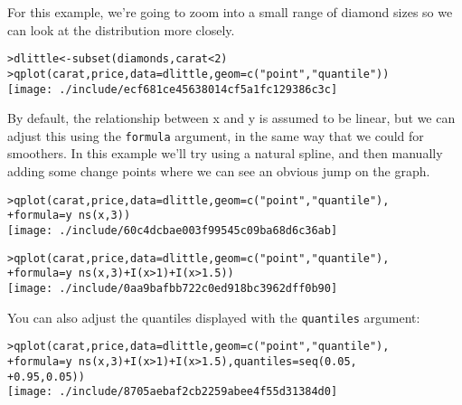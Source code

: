 For this example, we're going to zoom into a small range of diamond sizes so we can look at the distribution more closely.

\begin{alltt}
> dlittle <- subset(diamonds, carat < 2)
> qplot(carat, price, data = dlittle, geom = c("point", "quantile"))
\texttt{[image: ./include/ecf681ce45638014cf5a1fc129386c3c]}

\end{alltt}

By default, the relationship between x and y is assumed to be linear, but we can adjust this using the {\tt formula} argument, in the same way that we could for smoothers.  In this example we'll try using a natural spline, and then manually adding some change points where we can see an obvious jump on the graph.

\begin{alltt}
> qplot(carat, price, data = dlittle, geom = c("point", "quantile"), 
+     formula = y ~ ns(x, 3))
\texttt{[image: ./include/60c4dcbae003f99545c09ba68d6c36ab]}

> qplot(carat, price, data = dlittle, geom = c("point", "quantile"), 
+     formula = y ~ ns(x, 3) + I(x > 1) + I(x > 1.5))
\texttt{[image: ./include/0aa9bafbb722c0ed918bc3962dff0b90]}

\end{alltt}

You can also adjust the quantiles displayed with the {\tt quantiles} argument:

\begin{alltt}
> qplot(carat, price, data = dlittle, geom = c("point", "quantile"), 
+     formula = y ~ ns(x, 3) + I(x > 1) + I(x > 1.5), quantiles = seq(0.05, 
+         0.95, 0.05))
\texttt{[image: ./include/8705aebaf2cb2259abee4f55d31384d0]}

\end{alltt}

